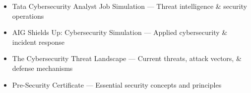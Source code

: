 \documentclass[a4paper,11pt]{article}
\begin{document}
\begin{itemize}[leftmargin=16pt, itemsep=2pt, label={\textcolor{accent}{\small$\diamond$}}]
  \item Tata Cybersecurity Analyst Job Simulation \textcolor{lighttext}{\small— Threat intelligence \& security operations}
  \item AIG Shields Up: Cybersecurity Simulation \textcolor{lighttext}{\small— Applied cybersecurity \& incident response}
  \item The Cybersecurity Threat Landscape \textcolor{lighttext}{\small— Current threats, attack vectors, \& defense mechanisms}
  \item Pre-Security Certificate \textcolor{lighttext}{\small— Essential security concepts and principles}
\end{itemize}
\end{document}
